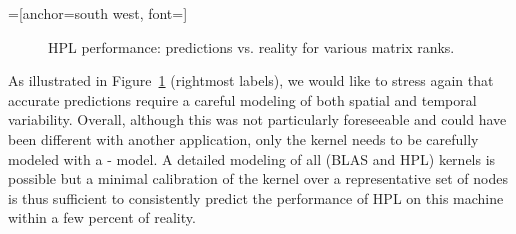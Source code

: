        =[anchor=south west, font=\scriptsize]
        \begin{figure}[htpb]
            \centering
            \begin{minipage}{0.8\linewidth}
                \caption{HPL performance: predictions vs. reality for various matrix ranks.}
                \label{fig:validation_performance}
            \end{minipage}%
            \begin{minipage}{0.2\linewidth}
            \end{minipage}
        \end{figure}

        As illustrated in Figure~\ref{fig:validation_performance} (rightmost labels), we would like to stress again that
        accurate predictions require a careful modeling of both spatial and temporal variability. Overall, although this
        was not particularly foreseeable and could have been different with another application, only the \dgemm kernel
        needs to be carefully modeled with a - model. A detailed modeling of all (BLAS and HPL)
        kernels is possible but a minimal calibration of the \dgemm kernel over a representative set of nodes is thus
        sufficient to consistently predict the performance of HPL on this machine within a few percent of reality.

